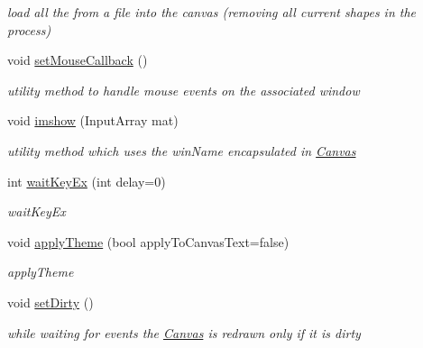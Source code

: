 \begin{DoxyCompactItemize}
\begin{DoxyCompactList}\small\item\em load all the from a file into the canvas (removing all current shapes in the process) \end{DoxyCompactList}\item 
void \hyperlink{classcanvascv_1_1Canvas_acf6e5d4b40aec610b0dc8c4f6bf93ac1}{set\+Mouse\+Callback} ()\hypertarget{classcanvascv_1_1Canvas_acf6e5d4b40aec610b0dc8c4f6bf93ac1}{}\label{classcanvascv_1_1Canvas_acf6e5d4b40aec610b0dc8c4f6bf93ac1}

\begin{DoxyCompactList}\small\item\em utility method to handle mouse events on the associated window \end{DoxyCompactList}\item 
void \hyperlink{classcanvascv_1_1Canvas_acaf9494a5668046dd0a8908aa97a7a43}{imshow} (Input\+Array mat)\hypertarget{classcanvascv_1_1Canvas_acaf9494a5668046dd0a8908aa97a7a43}{}\label{classcanvascv_1_1Canvas_acaf9494a5668046dd0a8908aa97a7a43}

\begin{DoxyCompactList}\small\item\em utility method which uses the win\+Name encapsulated in \hyperlink{classcanvascv_1_1Canvas}{Canvas} \end{DoxyCompactList}\item 
int \hyperlink{classcanvascv_1_1Canvas_a59397db05f5d9e45264f626f6a2ae528}{wait\+Key\+Ex} (int delay=0)
\begin{DoxyCompactList}\small\item\em wait\+Key\+Ex \end{DoxyCompactList}\item 
void \hyperlink{classcanvascv_1_1Canvas_a4915ddef2f0ff55a35f708d4721401d6}{apply\+Theme} (bool apply\+To\+Canvas\+Text=false)
\begin{DoxyCompactList}\small\item\em apply\+Theme \end{DoxyCompactList}\item 
void \hyperlink{classcanvascv_1_1Canvas_a9ead8dc40ae03cf1723e35e49a2ebaf5}{set\+Dirty} ()\hypertarget{classcanvascv_1_1Canvas_a9ead8dc40ae03cf1723e35e49a2ebaf5}{}\label{classcanvascv_1_1Canvas_a9ead8dc40ae03cf1723e35e49a2ebaf5}

\begin{DoxyCompactList}\small\item\em while waiting for events the \hyperlink{classcanvascv_1_1Canvas}{Canvas} is redrawn only if it is dirty \end{DoxyCompactList}\end{DoxyCompactItemize}
